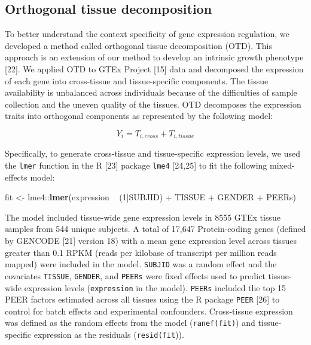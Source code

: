 \documentclass[]{article}
\newenvironment{Shaded}{\begin{snugshade}}{\end{snugshade}}
\newcommand{\KeywordTok}[1]{\textcolor[rgb]{0.13,0.29,0.53}{\textbf{{#1}}}}
\newcommand{\DecValTok}[1]{\textcolor[rgb]{0.00,0.00,0.81}{{#1}}}
\newcommand{\StringTok}[1]{\textcolor[rgb]{0.31,0.60,0.02}{{#1}}}
\newcommand{\NormalTok}[1]{{#1}}
\begin{document}
\subsection{Orthogonal tissue
decomposition}\label{orthogonal-tissue-decomposition}

To better understand the context specificity of gene expression
regulation, we developed a method called orthogonal tissue decomposition
(OTD). This approach is an extension of our method to develop an
intrinsic growth phenotype {[}22{]}. We applied OTD to GTEx Project
{[}15{]} data and decomposed the expression of each gene into
cross-tissue and tissue-specific components. The tissue availability is
unbalanced across individuals because of the difficulties of sample
collection and the uneven quality of the tissues. OTD decomposes the
expression traits into orthogonal components as represented by the
following model:

\[ Y_i = T_{i,cross} + T_{i,tissue} \]

Specifically, to generate cross-tissue and tissue-specific expression
levels, we used the \texttt{lmer} function in the R {[}23{]} package
\texttt{lme4} {[}24,25{]} to fit the following mixed-effects model:

\begin{Shaded}
\begin{Highlighting}[]
\NormalTok{fit <-}\StringTok{ }\NormalTok{lme4::}\KeywordTok{lmer}\NormalTok{(expression ~}\StringTok{ }\NormalTok{(}\DecValTok{1}\NormalTok{|SUBJID) +}\StringTok{ }\NormalTok{TISSUE +}\StringTok{ }\NormalTok{GENDER +}\StringTok{ }\NormalTok{PEERs)}
\end{Highlighting}
\end{Shaded}

The model included tissue-wide gene expression levels in 8555 GTEx
tissue samples from 544 unique subjects. A total of 17,647
Protein-coding genes (defined by GENCODE {[}21{]} version 18) with a
mean gene expression level across tissues greater than 0.1 RPKM (reads
per kilobase of transcript per million reads mapped) were included in
the model. \texttt{SUBJID} was a random effect and the covariates
\texttt{TISSUE}, \texttt{GENDER}, and \texttt{PEERs} were fixed effects
used to predict tissue-wide expression levels (\texttt{expression} in
the model). \texttt{PEERs} included the top 15 PEER factors estimated
across all tissues using the R package \texttt{PEER} {[}26{]} to control
for batch effects and experimental confounders. Cross-tissue expression
was defined as the random effects from the model (\texttt{ranef(fit)})
and tissue-specific expression as the residuals (\texttt{resid(fit})).
\end{document}
